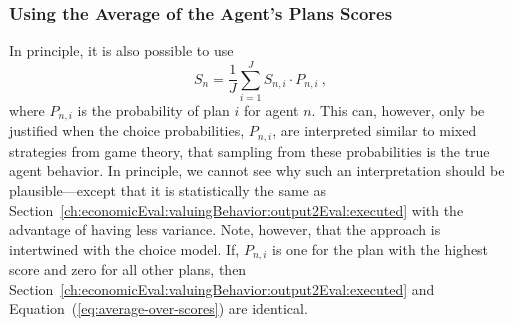 %

\subsubsection{Using the Average of the Agent's Plans Scores}
\label{ch:economicEval:valuingBehavior:output2Eval:average}
In principle, it is also possible to use
%
\begin{equation}
S_n = \frac{1}{J} \sum_{i=1}^J S_{n,i} \cdot P_{n,i} \ ,
\label{eq:average-over-scores}
\end{equation}
%
where $P_{n,i}$ is the probability of plan $i$ for agent $n$. This can, however, only be justified when the choice probabilities, $P_{n,i}$, are interpreted similar to mixed strategies from game theory, \ie that sampling from these probabilities is the true agent behavior.  In principle, we cannot see why such an interpretation should be plausible---except that it is statistically the same as Section~\ref{ch:economicEval:valuingBehavior:output2Eval:executed} with the advantage of having less variance.  Note, however, that the approach is intertwined with the choice model. If, \eg $P_{n,i}$ is one for the plan with the highest score and zero for all other plans, then Section~\ref{ch:economicEval:valuingBehavior:output2Eval:executed} and Equation~(\ref{eq:average-over-scores}) are identical.  

